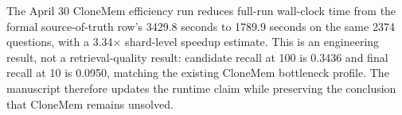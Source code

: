 The April 30 CloneMem efficiency run reduces full-run wall-clock time from the formal source-of-truth row's 3429.8 seconds to 1789.9 seconds on the same 2374 questions, with a 3.34$\times$ shard-level speedup estimate. This is an engineering result, not a retrieval-quality result: candidate recall at 100 is 0.3436 and final recall at 10 is 0.0950, matching the existing CloneMem bottleneck profile. The manuscript therefore updates the runtime claim while preserving the conclusion that CloneMem remains unsolved.
